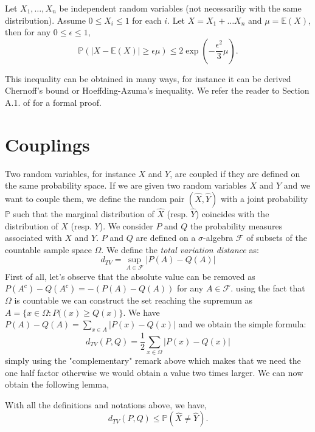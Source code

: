 \begin{theorem}\label{chernoff3}
	Let $X_1, \ldots, X_n$ be independent random variables (not necessariliy with the same distribution).
	Assume $0 \leq X_i \leq 1$ for each $i$.
	Let $X = X_1 + \ldots X_n$ and $\mu = \mathbb{E}(X)$,
	then for any $0 \leq \epsilon \leq 1$,
	\begin{equation}
		\mathbb{P}( |X - \mathbb{E}(X)| \geq \epsilon \mu ) \leq 2\exp(-\frac{\epsilon^2}{3}\mu).
	\end{equation}
\end{theorem}
This inequality can be obtained in many ways, for instance it can be derived Chernoff's bound or Hoeffding-Azuma's inequality.
We refer the reader to Section A.1. of \cite{Alon16} for a formal proof.
\section{Couplings}
Two random variables, for instance $X$ and $Y$, are coupled if they are defined on the same probability space.
If we are given two random variables $X$ and $Y$ and we want to couple them, we define the random pair $(\hat{X}, \hat{Y})$ with a joint probability $\mathbb{P}$ 
such that the marginal distribution of $\hat{X}$ (resp. $\hat{Y}$) coincides with the distribution of $X$ (resp. $Y$).
We consider $P$ and $Q$ the probability measures associated with $X$ and $Y$.
$P$ and $Q$ are defined on a $\sigma$-algebra $\mathcal{F}$ of subsets of the countable sample space $\Omega$.
We define the \emph{total variation distance} as:
\begin{equation}
	d_{TV} = \sup_{A \in \mathcal{F}} |P(A) - Q(A)|
\end{equation}
First of all, let's observe that the absolute value can be removed as $P(A^c) - Q(A^c) = -(P(A) - Q(A))$ for any $A \in \mathcal{F}$.
using the fact that $\Omega$ is countable we can construct the set reaching the supremum as $A = \{x\in \Omega: P((x) \geq Q(x)\}$.
We have $P(A) - Q(A) = \sum_{x \in A} |P(x) - Q(x)|$
and we obtain the simple formula:
\begin{equation}
	d_{TV}(P, Q) = \frac{1}{2} \sum_{x \in \Omega} |P(x) - Q(x)|
\end{equation}
simply using the "complementary" remark above which makes that we need the one half factor otherwise we would obtain a value two times larger.
We can now obtain the following lemma,
\begin{lemma}\label{th:coupIneq}
	With all the definitions and notations above, we have,
	\begin{equation}
		d_{TV}(P, Q) \leq \mathbb{P}(\hat{X} \neq \hat{Y}).
	\end{equation}
\end{lemma}

